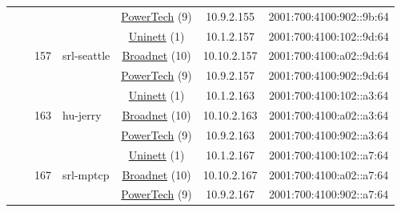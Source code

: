 \begin{small}
\begin{center}
\begin{longtable}{|c|c|c|c|c|c|c|c|}
  &  &  &  & \multicolumn{2}{|c|}{\tiny{\href{http://www.powertech.no}{PowerTech} (9)}} & \tiny{10.9.2.155} & \tiny{2001:700:4100:902::9b:64} \\* \cline{3-3}\cline{4-4}\cline{5-5}\cline{6-6}\cline{7-7}\cline{8-8}
  &  & \multirow{3}{*}{\tiny{157}} & \multicolumn{1}{|l|}{\multirow{3}{*}{\tiny{srl-seattle}}} & \multicolumn{2}{|c|}{\tiny{\href{https://www.uninett.no}{Uninett} (1)}} & \tiny{10.1.2.157} & \tiny{2001:700:4100:102::9d:64} \\* \cline{5-5}\cline{6-6}\cline{7-7}\cline{8-8}
  &  &  &  & \multicolumn{2}{|c|}{\tiny{\href{https://www.broadnet.no}{Broadnet} (10)}} & \tiny{10.10.2.157} & \tiny{2001:700:4100:a02::9d:64} \\* \cline{5-5}\cline{6-6}\cline{7-7}\cline{8-8}
  &  &  &  & \multicolumn{2}{|c|}{\tiny{\href{http://www.powertech.no}{PowerTech} (9)}} & \tiny{10.9.2.157} & \tiny{2001:700:4100:902::9d:64} \\* \cline{3-3}\cline{4-4}\cline{5-5}\cline{6-6}\cline{7-7}\cline{8-8}
  &  & \multirow{3}{*}{\tiny{163}} & \multicolumn{1}{|l|}{\multirow{3}{*}{\tiny{hu-jerry}}} & \multicolumn{2}{|c|}{\tiny{\href{https://www.uninett.no}{Uninett} (1)}} & \tiny{10.1.2.163} & \tiny{2001:700:4100:102::a3:64} \\* \cline{5-5}\cline{6-6}\cline{7-7}\cline{8-8}
  &  &  &  & \multicolumn{2}{|c|}{\tiny{\href{https://www.broadnet.no}{Broadnet} (10)}} & \tiny{10.10.2.163} & \tiny{2001:700:4100:a02::a3:64} \\* \cline{5-5}\cline{6-6}\cline{7-7}\cline{8-8}
  &  &  &  & \multicolumn{2}{|c|}{\tiny{\href{http://www.powertech.no}{PowerTech} (9)}} & \tiny{10.9.2.163} & \tiny{2001:700:4100:902::a3:64} \\* \cline{3-3}\cline{4-4}\cline{5-5}\cline{6-6}\cline{7-7}\cline{8-8}
  &  & \multirow{3}{*}{\tiny{167}} & \multicolumn{1}{|l|}{\multirow{3}{*}{\tiny{srl-mptcp}}} & \multicolumn{2}{|c|}{\tiny{\href{https://www.uninett.no}{Uninett} (1)}} & \tiny{10.1.2.167} & \tiny{2001:700:4100:102::a7:64} \\* \cline{5-5}\cline{6-6}\cline{7-7}\cline{8-8}
  &  &  &  & \multicolumn{2}{|c|}{\tiny{\href{https://www.broadnet.no}{Broadnet} (10)}} & \tiny{10.10.2.167} & \tiny{2001:700:4100:a02::a7:64} \\* \cline{5-5}\cline{6-6}\cline{7-7}\cline{8-8}
  &  &  &  & \multicolumn{2}{|c|}{\tiny{\href{http://www.powertech.no}{PowerTech} (9)}} & \tiny{10.9.2.167} & \tiny{2001:700:4100:902::a7:64} \\* \cline{3-3}\cline{4-4}\cline{5-5}\cline{6-6}\cline{7-7}\cline{8-8}

\end{longtable}
\end{center}
\end{small}
